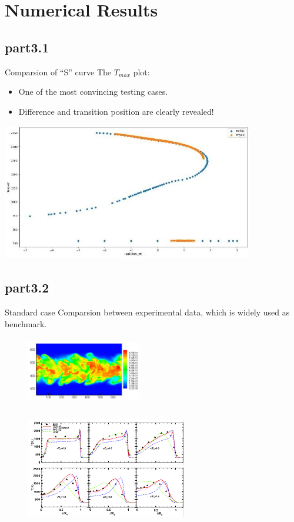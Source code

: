 \section{Numerical Results}
	\subsection{part3.1}
		\begin{xframe}{Comparsion of ``S'' curve}
			The $T_{max}$ plot:
			\begin{itemize}
				\item
					One of the most convincing testing cases.
				\item
					Difference and transition position are clearly revealed! 
			\end{itemize}			
			\includegraphics[width=11cm, height=6cm]{../pic/Tmax.jpg}	
		\end{xframe}
	\subsection{part3.2}
		\begin{xframe}{Standard case}
			Comparsion between experimental data, which is widely used as benchmark.
			\begin{figure}
				\begin{minipage}{3.5cm}
					\centering
					\includegraphics[height=3cm, width=5cm]{../pic/slice.png}
				\end{minipage}%
				\begin{minipage}{7.5cm}
					\centering
					\includegraphics[height=5.5cm, width=7cm]{../pic/line.png}
				\end{minipage}%
			\end{figure}
		\end{xframe}


